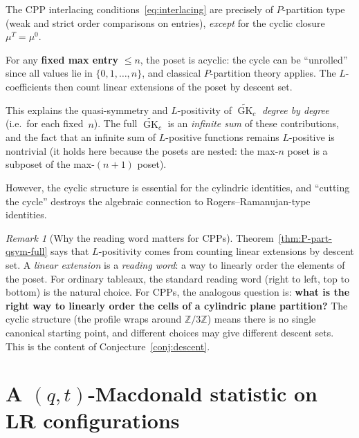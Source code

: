 \documentclass[11pt]{article}
\theoremstyle{plain}
\theoremstyle{definition}
\theoremstyle{remark}
\newtheorem{remark}[theorem]{Remark}
\newcommand{\Z}{\mathbb{Z}}
\newcommand{\GK}{\operatorname{GK}}
\begin{document}
The CPP interlacing conditions~\eqref{eq:interlacing} are
precisely of $P$-partition type (weak and strict order comparisons
on entries), \emph{except} for the cyclic closure
$\mu^T = \mu^0$.

For any \textbf{fixed max entry} $\leq n$, the poset is acyclic:
the cycle can be ``unrolled'' since all values lie in
$\{0, 1, \ldots, n\}$, and classical $P$-partition theory
applies.  The $L$-coefficients then count linear
extensions of the poset by descent set.

This explains the quasi-symmetry and $L$-positivity of
$\widetilde{\GK}_c$ \emph{degree by degree} (i.e.\ for each
fixed~$n$).  The full $\widetilde{\GK}_c$ is an \emph{infinite
sum} of these contributions, and the fact that an infinite sum
of $L$-positive functions remains $L$-positive is nontrivial
(it holds here because the posets are nested: the max-$n$ poset
is a subposet of the max-$(n+1)$ poset).

However, the cyclic structure is essential for the cylindric
identities, and ``cutting the cycle'' destroys the algebraic
connection to Rogers--Ramanujan-type identities.

\begin{remark}[Why the reading word matters for CPPs]
\label{rem:reading-word-cpp}
Theorem~\ref{thm:P-part-qsym-full} says that $L$-positivity
comes from counting linear extensions by descent set.
A \emph{linear extension} is a \emph{reading word}: a way to
linearly order the elements of the poset.  For ordinary
tableaux, the standard reading word (right to left, top to
bottom) is the natural choice.  For CPPs, the analogous question
is: \textbf{what is the right way to linearly order the cells of
a cylindric plane partition?}  The cyclic structure (the profile
wraps around $\Z/3\Z$) means there is no single canonical
starting point, and different choices may give different descent
sets.  This is the content of
Conjecture~\ref{conj:descent}.
\end{remark}


\section{A $(q,t)$-Macdonald statistic on LR configurations}
\label{sec:vertex-model}
\end{document}
